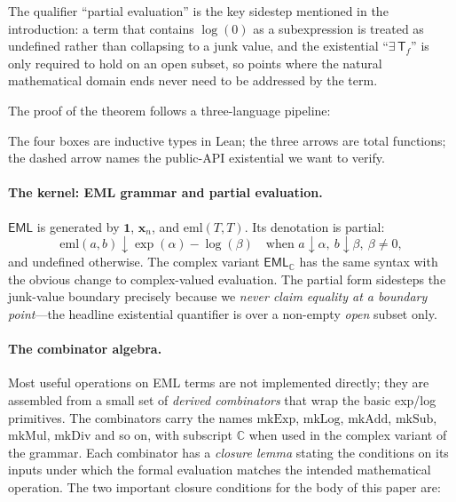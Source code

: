 \documentclass[11pt,a4paper]{article}
\newcommand{\F}{\mathsf{F36}}
\newcommand{\EL}{\mathsf{EL}}
\newcommand{\EML}{\mathsf{EML}}
\newcommand{\EMLC}{\mathsf{EML}_{\mathbb{C}}}
\newcommand{\eml}{\mathrm{eml}}
\theoremstyle{plain}
\theoremstyle{definition}
\begin{document}
The qualifier ``partial evaluation'' is the key sidestep mentioned in
the introduction: a term that contains $\log(0)$ as a subexpression
is treated as undefined rather than collapsing to a junk value, and
the existential ``$\exists\, \mathsf{T}_f$'' is only required to hold
on an open subset, so points where the natural mathematical domain
ends never need to be addressed by the term.

\medskip

The proof of the theorem follows a three-language pipeline:

\begin{center}
\end{center}

The four boxes are inductive types in Lean; the three arrows are total
functions; the dashed arrow names the public-API existential we want
to verify.

\paragraph{The kernel: EML grammar and partial evaluation.}
$\EML$ is generated by $\mathbf{1}$, $\mathbf{x}_n$, and $\eml(T, T)$.
Its denotation is partial:
\begin{equation}
    \eml(a, b) \downarrow \exp(\alpha) - \log(\beta)
    \quad \text{when } a \downarrow \alpha,\ b \downarrow \beta,\ \beta \neq 0,
\end{equation}
and undefined otherwise. The complex variant $\EMLC$ has the same
syntax with the obvious change to complex-valued evaluation. The
partial form sidesteps the junk-value boundary precisely because we
\emph{never claim equality at a boundary point}---the headline
existential quantifier is over a non-empty \emph{open} subset only.

\paragraph{The combinator algebra.}
Most useful operations on EML terms are not implemented directly; they
are assembled from a small set of \emph{derived combinators} that wrap
the basic exp/log primitives. The combinators carry the names
$\mathrm{mkExp}$, $\mathrm{mkLog}$, $\mathrm{mkAdd}$, $\mathrm{mkSub}$,
$\mathrm{mkMul}$, $\mathrm{mkDiv}$ and so on, with subscript $\mathbb{C}$
when used in the complex variant of the grammar. Each combinator has a
\emph{closure lemma} stating the conditions on its inputs under which
the formal evaluation matches the intended mathematical operation. The
two important closure conditions for the body of this paper are:
\end{document}
